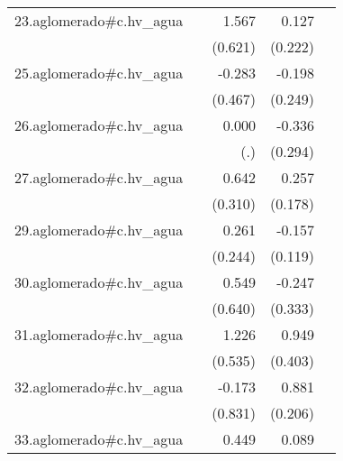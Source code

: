 {\begin{longtable}{l*{4}{D{.}{.}{-1}}}
\addlinespace
23.aglomerado#c.hv\_agua&                     &       1.567\sym{*}  &       0.127         &                     \\
            &                     &     (0.621)         &     (0.222)         &                     \\
\addlinespace
25.aglomerado#c.hv\_agua&                     &      -0.283         &      -0.198         &                     \\
            &                     &     (0.467)         &     (0.249)         &                     \\
\addlinespace
26.aglomerado#c.hv\_agua&                     &       0.000         &      -0.336         &                     \\
            &                     &         (.)         &     (0.294)         &                     \\
\addlinespace
27.aglomerado#c.hv\_agua&                     &       0.642\sym{*}  &       0.257         &                     \\
            &                     &     (0.310)         &     (0.178)         &                     \\
\addlinespace
29.aglomerado#c.hv\_agua&                     &       0.261         &      -0.157         &                     \\
            &                     &     (0.244)         &     (0.119)         &                     \\
\addlinespace
30.aglomerado#c.hv\_agua&                     &       0.549         &      -0.247         &                     \\
            &                     &     (0.640)         &     (0.333)         &                     \\
\addlinespace
31.aglomerado#c.hv\_agua&                     &       1.226\sym{*}  &       0.949\sym{*}  &                     \\
            &                     &     (0.535)         &     (0.403)         &                     \\
\addlinespace
32.aglomerado#c.hv\_agua&                     &      -0.173         &       0.881\sym{***}&                     \\
            &                     &     (0.831)         &     (0.206)         &                     \\
\addlinespace
33.aglomerado#c.hv\_agua&                     &       0.449\sym{*}  &       0.089         &                     \\

\end{longtable}}
